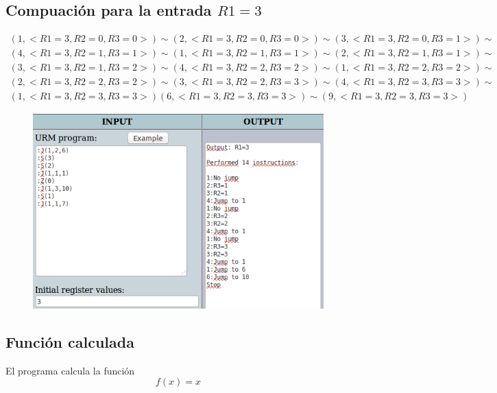 	\subsection{Compuación para la entrada $R1=3$}
	\begin{equation*}\begin{gathered}
	(1, <R1=3, R2=0, R3=0>) \sim (2, <R1=3, R2=0, R3=0>) \sim (3, <R1=3, R2=0, R3=1>) \sim\\
	(4, <R1=3, R2=1, R3=1>) \sim (1, <R1=3, R2=1, R3=1>) \sim (2, <R1=3, R2=1, R3=1>) \sim\\
	(3, <R1=3, R2=1, R3=2>) \sim (4, <R1=3, R2=2, R3=2>) \sim (1, <R1=3, R2=2, R3=2>) \sim\\
	(2, <R1=3, R2=2, R3=2>) \sim (3, <R1=3, R2=2, R3=3>) \sim (4, <R1=3, R2=3, R3=3>) \sim\\
	(1, <R1=3, R2=3, R3=3>)(6, <R1=3, R2=3, R3=3>) \sim (9, <R1=3, R2=3, R3=3>)
	\end{gathered}\end{equation*}
	\begin{figure}[H]
  		\centering
  		\includegraphics[scale=0.5]{images/63.png}
  	\end{figure}
	\subsection{Función calculada}
	El programa calcula la función
	\begin{equation*}
		f(x)=x
	\end{equation*}
